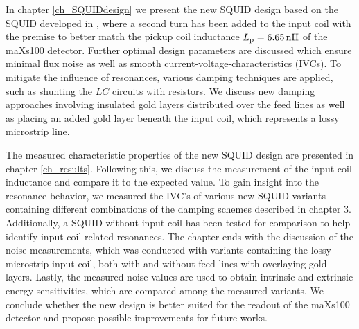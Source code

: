 In chapter \ref{ch_SQUIDdesign} we present the new SQUID design based on the SQUID developed in \cite{Bauer2022}, where a second turn has been added to the input coil with the premise to better match the pickup coil inductance $L_{\rm p}=\qty{6.65}{\nH}$ of the maXs100 detector. Further optimal design parameters are discussed which ensure minimal flux noise as well as smooth current-voltage-characteristics (IVCs). To mitigate the influence of resonances, various damping techniques are applied, such as shunting the $LC$ circuits with resistors. We discuss new damping approaches involving insulated gold layers distributed over the feed lines as well as placing an added gold layer beneath the input coil, which represents a lossy microstrip line.  

The measured characteristic properties of the new SQUID design are presented in chapter \ref{ch_results}. Following this, we discuss the measurement of the input coil inductance and compare it to the expected value. To gain insight into the resonance behavior, we measured the IVC's of various new SQUID variants containing different combinations of the damping schemes described in chapter 3. Additionally, a SQUID without input coil has been tested for comparison to help identify input coil related resonances. The chapter ends with the discussion of the noise measurements, which was conducted with variants containing the lossy microstrip input coil, both with and without feed lines with overlaying gold layers. Lastly, the measured noise values are used to obtain intrinsic and extrinsic energy sensitivities, which are compared among the measured variants. We conclude whether the new design is better suited for the readout of the maXs100 detector and propose possible improvements for future works.    
